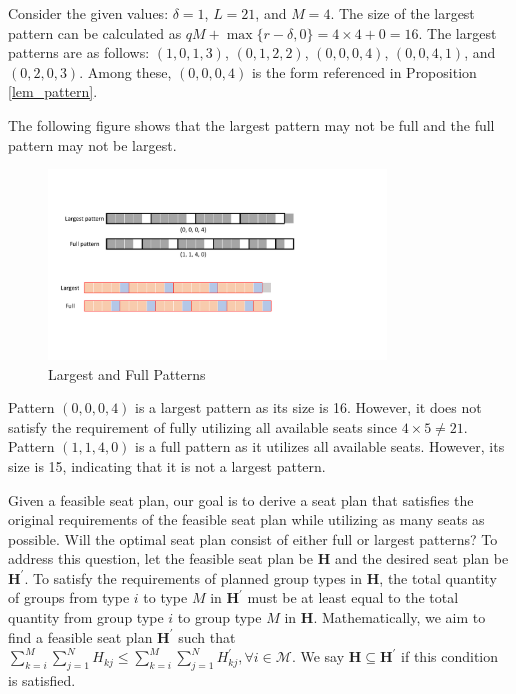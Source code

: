 \begin{example}\label{ex_2}
Consider the given values: $\delta = 1$, $L = 21$, and $M = 4$. The size of the largest pattern can be calculated as $qM + \max\{r-\delta, 0\} = 4 \times 4 + 0 = 16$. The largest patterns are as follows: $(1, 0, 1, 3)$, $(0, 1, 2, 2)$, $(0, 0, 0, 4)$, $(0, 0, 4, 1)$, and $(0, 2, 0, 3)$. Among these, $(0, 0, 0, 4)$ is the form referenced in Proposition \ref{lem_pattern}.

The following figure shows that the largest pattern may not be full and the full pattern may not be largest.
\begin{figure}[ht]
    \centering
        \includegraphics[width=0.8\textwidth]{./Figures/largest_full.pdf}
    \caption{Largest and Full Patterns}
\end{figure}

Pattern $(0, 0, 0, 4)$ is a largest pattern as its size is 16. However, it does not satisfy the requirement of fully utilizing all available seats since $4 \times 5 \neq 21$. Pattern $(1, 1, 4, 0)$ is a full pattern as it utilizes all available seats. However, its size is 15, indicating that it is not a largest pattern.
\end{example}


 Given a feasible seat plan, our goal is to derive a seat plan that satisfies the original requirements of the feasible seat plan while utilizing as many seats as possible. Will the optimal seat plan consist of either full or largest patterns? To address this question, let the feasible seat plan be $\bm{H}$ and the desired seat plan be $\bm{H}^{\prime}$. To satisfy the requirements of planned group types in $\bm{H}$, the total quantity of groups from type $i$ to type $M$ in $\bm{H}^{\prime}$ must be at least equal to the total quantity from group type $i$ to group type $M$ in $\bm{H}$. Mathematically, we aim to find a feasible seat plan $\bm{H}^{\prime}$ such that $\sum_{k=i}^{M} \sum_{j=1}^{N} H_{kj} \leq \sum_{k=i}^{M} \sum_{j=1}^{N} H^{\prime}_{kj}, \forall i \in \mathcal{M}$. We say $\bm{H} \subseteq \bm{H}^{\prime}$ if this condition is satisfied.

